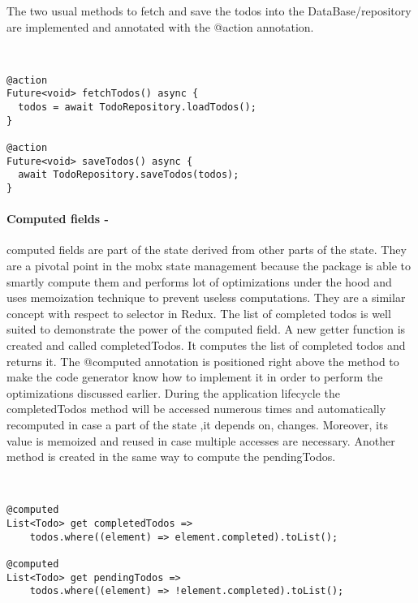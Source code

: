 The two usual methods to fetch and save the todos into the DataBase/repository are implemented and annotated with the @action annotation.
\begin{code}
\mbox{}\\
 \mbox{}
		\label{code:2.14}
\begin{verbatim}
@action
Future<void> fetchTodos() async {
  todos = await TodoRepository.loadTodos();
}

@action
Future<void> saveTodos() async {
  await TodoRepository.saveTodos(todos);
}
\end{verbatim}
\mbox{}
\end{code}

\paragraph{Computed fields - }
\label{subpar:todo_app_bloc_core_state}computed fields are part of the state derived from other parts of the state. They are a pivotal point in the mobx state management because the package is able to smartly compute them and performs  lot of optimizations under the hood and uses memoization technique to prevent useless computations. They are a similar concept with respect to selector in Redux. The list of completed todos is well suited to demonstrate the power of the computed field. A new getter function is created and called completedTodos. It computes the list of completed todos and returns it. The @computed annotation is positioned right above the method to make the code generator know how to implement it in order to perform the optimizations discussed earlier. During the application lifecycle the completedTodos method will be accessed numerous times and automatically recomputed in case a part of the state ,it depends on, changes. Moreover, its value is memoized and reused in case multiple accesses are necessary. Another method is created in the same way to compute the pendingTodos.
\begin{code}
\mbox{}\\
 \mbox{}
		\label{code:2.14}
\begin{verbatim}
@computed
List<Todo> get completedTodos =>
    todos.where((element) => element.completed).toList();

@computed
List<Todo> get pendingTodos =>
    todos.where((element) => !element.completed).toList();
\end{verbatim}
\mbox{}
\end{code}


